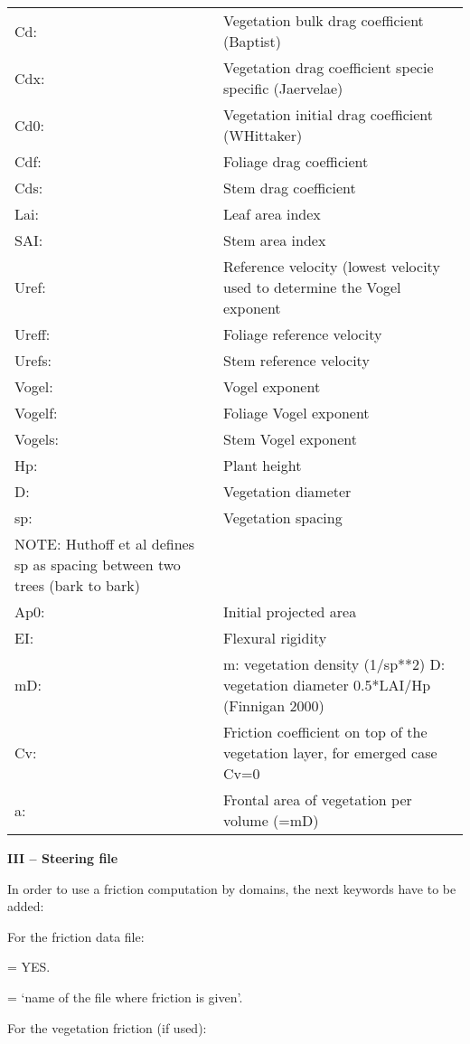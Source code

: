 \begin{tabular}{p{0.5in}p{5.0in}} 
Cd: & Vegetation bulk drag coefficient (Baptist)\\
Cdx: & Vegetation drag coefficient specie specific (Jaervelae)\\
Cd0: & Vegetation initial drag coefficient (WHittaker)\\
Cdf: & Foliage drag coefficient \\
Cds: & Stem drag coefficient \\
Lai: & Leaf area index \\
SAI: & Stem area index \\
Uref: & Reference velocity (lowest velocity used to determine the Vogel exponent \\
Ureff: & Foliage reference velocity \\
Urefs: & Stem reference velocity \\
Vogel: & Vogel exponent \\
Vogelf: & Foliage Vogel exponent \\
Vogels: & Stem Vogel exponent \\
Hp: & Plant height \\
D: & Vegetation diameter \\
sp: & Vegetation spacing  \\
NOTE: Huthoff et al defines sp as spacing between two trees (bark to bark)\\
Ap0: & Initial projected area \\
EI: & Flexural rigidity \\
mD: & m: vegetation density (1/sp**2) D: vegetation diameter 0.5*LAI/Hp (Finnigan 2000) \\
Cv: & Friction coefficient on top of the vegetation layer, for emerged case Cv=0\\
a: & Frontal area of vegetation per volume (=mD) \\
\end{tabular}




\textbf{III -- Steering file}

In order to use a friction computation by domains, the next keywords have to be
added:

For the friction data file:

 = YES.

 = `name of the file where friction is given'.

For the vegetation friction (if used):


